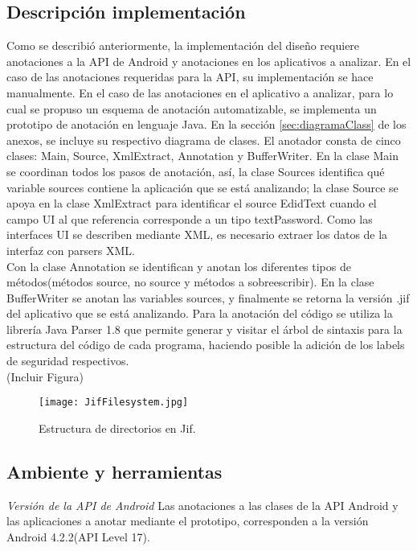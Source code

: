 \subsection{Descripción implementación}
Como se describió anteriormente, la implementación del diseño requiere
anotaciones a la API de Android y anotaciones en los aplicativos a
analizar.\newline 
En el caso de las anotaciones requeridas para la API, su
implementación se hace manualmente.\newline
En el caso de las anotaciones en el aplicativo a analizar, para lo
cual se propuso un esquema de anotación automatizable, se implementa un
prototipo de anotación en lenguaje Java. En la sección \ref{sec:diagramaClass}
de los anexos, se incluye su respectivo diagrama de clases.\newline
El anotador consta de cinco clases: Main, Source, XmlExtract, Annotation y
BufferWriter. 
En la clase Main se coordinan todos los pasos de anotación, así, la clase
Sources  identifica qué variable sources contiene la aplicación que se está
analizando; la clase Source  se apoya en la clase XmlExtract  para
identificar el source EdidText cuando el campo UI al que referencia corresponde
a un tipo textPassword. Como las interfaces UI se describen mediante XML, es
necesario extraer los datos de la interfaz con parsers XML.\\
Con la clase Annotation  se identifican y anotan los diferentes tipos de
métodos(métodos source, no source y métodos a sobreescribir).
En la clase BufferWriter  se anotan las variables sources, y finalmente se
retorna la versión .jif del aplicativo que se está analizando.\newline 
Para la anotación del código se utiliza la librería Java Parser 1.8  que permite
generar y visitar el árbol de sintaxis para la estructura del código de cada
programa, haciendo posible la adición de los labels de seguridad respectivos.\\
(Incluir Figura)\newline
\label{subsec:anotador}
\begin{figure}[t!]
	\begin{center}
	\texttt{[image: JifFilesystem.jpg]}
	\end{center}
	\caption{Estructura de directorios en Jif.}
	\label{fig:jifFilesystem} 
\end{figure}

\subsection{Ambiente y herramientas}
\textit{Versión de la API de Android}\newline
Las anotaciones a las clases de la API Android y las aplicaciones a anotar
mediante el prototipo, corresponden a la versión Android 4.2.2(API Level 17).

